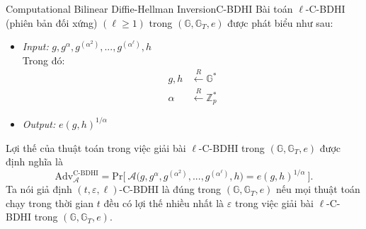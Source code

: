 \documentclass[class=report, crop=false]{standalone}
\begin{document}
			\begin{problem}{Computational Bilinear Diffie-Hellman Inversion}{C-BDHI}
				Bài toán $\ell$-C-BDHI (phiên bản đối xứng) $(\ell \geq 1)$ trong $(\mathbb{G}, \mathbb{G}_T, e)$ được phát biểu như sau:
				\vspace{-\baselineskip}
				\begin{itemize}[leftmargin=1.5cm, itemindent=-0.5cm]
					\item[] \textit{Input:} $g, g^\alpha, g^{(\alpha^2)}, ..., g^{(\alpha^\ell)}, h$ \\
					Trong đó: \vspace{-\baselineskip}
					\begin{align*}
						g, h 	&\xleftarrow{R} \mathbb{G}^* \\
						\alpha 	&\xleftarrow{R} \mathbb{Z}_p^*
					\end{align*}
					\item[] \textit{Output:} $e(g, h)^{1/\alpha}$
				\end{itemize}
				\vspace{-\baselineskip}\par
				Lợi thế của thuật toán \algo trong việc giải bài $\ell$-C-BDHI trong $(\mathbb{G}, \mathbb{G}_T, e)$ được định nghĩa là
				\[
					\text{Adv}_{\mathcal{A}}^{\text{C-BDHI}} = \text{Pr}\bigg[ \ \mathcal{A}\Big(g, g^\alpha, g^{(\alpha^2)}, ..., g^{(\alpha^\ell)}, h \Big) = e(g, h)^{1/\alpha} \ \bigg].
				\] \indent
				Ta nói giả định $(t, \varepsilon, \ell)$-C-BDHI là đúng trong $(\mathbb{G}, \mathbb{G}_T, e)$ nếu mọi thuật toán chạy trong thời gian $t$ đều có lợi thế nhiều nhất là $\varepsilon$ trong việc giải bài $\ell$-C-BDHI trong $(\mathbb{G}, \mathbb{G}_T, e)$.
			\end{problem}
\end{document}
